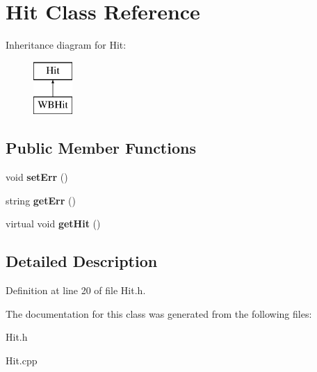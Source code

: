 \hypertarget{class_hit}{\section{Hit Class Reference}
\label{class_hit}
}
Inheritance diagram for Hit\+:\begin{figure}[H]
\begin{center}
\leavevmode
\includegraphics[height=2.000000cm]{class_hit}
\end{center}
\end{figure}
\subsection*{Public Member Functions}
\begin{DoxyCompactItemize}
\item 
\hypertarget{class_hit_a4564cb7f92efc815e5433a8593fd048f}{void {\bfseries set\+Err} ()}\label{class_hit_a4564cb7f92efc815e5433a8593fd048f}

\item 
\hypertarget{class_hit_a2bf9896f9e6c5749ea97027c004b33df}{string {\bfseries get\+Err} ()}\label{class_hit_a2bf9896f9e6c5749ea97027c004b33df}

\item 
\hypertarget{class_hit_af5ab95c622dbb5265d57228c0fc3e0ac}{virtual void {\bfseries get\+Hit} ()}\label{class_hit_af5ab95c622dbb5265d57228c0fc3e0ac}

\end{DoxyCompactItemize}


\subsection{Detailed Description}


Definition at line 20 of file Hit.\+h.



The documentation for this class was generated from the following files\+:\begin{DoxyCompactItemize}
\item 
Hit.\+h\item 
Hit.\+cpp\end{DoxyCompactItemize}
